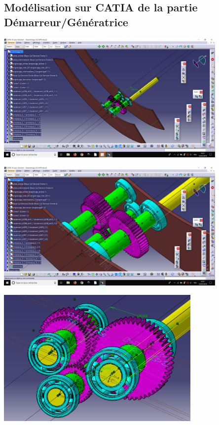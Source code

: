 \documentclass{config}
\begin{document}
\begin{spacing}{1.2}
\newpage
\subsection{Modélisation sur CATIA de la partie Démarreur/Génératrice}

\begin{center}
\includegraphics[width=0.85\textwidth]{vue3D_BE.png}
\end{center}

\begin{center}
\includegraphics[width=0.85\textwidth]{vue_3D_BE_Zoom.png}
\end{center}

\begin{center}
\includegraphics[width=0.75\textwidth]{Vue_3D_sans_carter.PNG}
\end{center}


\end{spacing}
\end{document}
